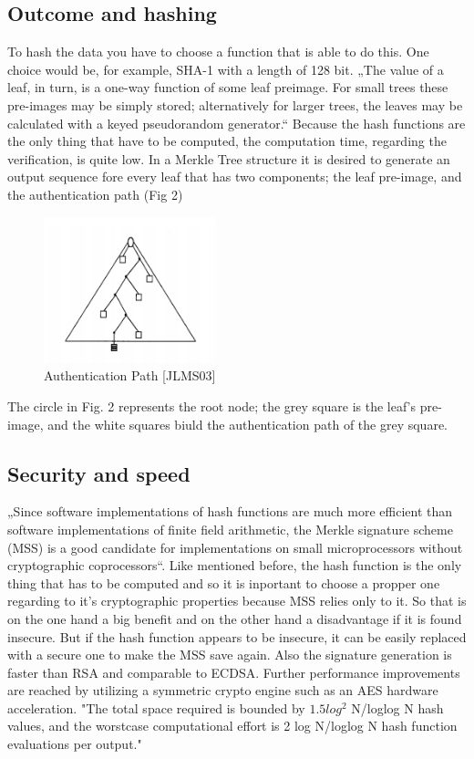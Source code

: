 \subsection{Outcome and hashing}
To hash the data you have to choose a function that is able to do this. One choice would be, for example, SHA-1 with a length of 128 bit.
„The value of a leaf, in turn, is a one-way function of some leaf preimage. For small trees these pre-images may be simply stored; alternatively for larger trees, the leaves may be calculated with a keyed pseudorandom generator.“ \cite{MT} Because the hash functions are the only thing that have to be computed, the computation time, regarding the verification, is quite low. \cite{METR} In a Merkle Tree structure it is desired to generate an output sequence fore every leaf that has two components; the leaf pre-image, and the authentication path (Fig 2) \cite{MT}

\begin{figure}
\centering
\includegraphics[width=5cm]{Pages/Merkle/API.png}
\caption{Authentication Path [JLMS03]}
\end{figure}

The circle in Fig. 2 represents the root node; the grey square is the leaf’s pre-image, and the white squares biuld the authentication path of the grey square.

\subsection{Security and speed}
„Since software implementations of hash functions are much more efficient than software implementations of finite field arithmetic, the Merkle signature scheme (MSS) is a good candidate for implementations on small microprocessors without cryptographic coprocessors“. \cite{FHB} Like mentioned before, the hash function is the only thing that has to be computed and so it is inportant to choose a propper one regarding to it’s cryptographic properties because MSS relies only to it. So that is on the one hand a big benefit and on the other hand a disadvantage if it is found insecure. But if the hash function appears to be insecure, it can be easily replaced with a secure one to make the MSS save again. Also the signature generation is faster than RSA and comparable to ECDSA. Further performance improvements are reached by utilizing a symmetric crypto engine such as an AES hardware acceleration. \cite{FHB}  "The total space
required is bounded by $ 1.5 log^2 $  N/loglog N hash values, and the worstcase computational effort is 2 log N/loglog N hash function evaluations
per output." \cite{MT}
